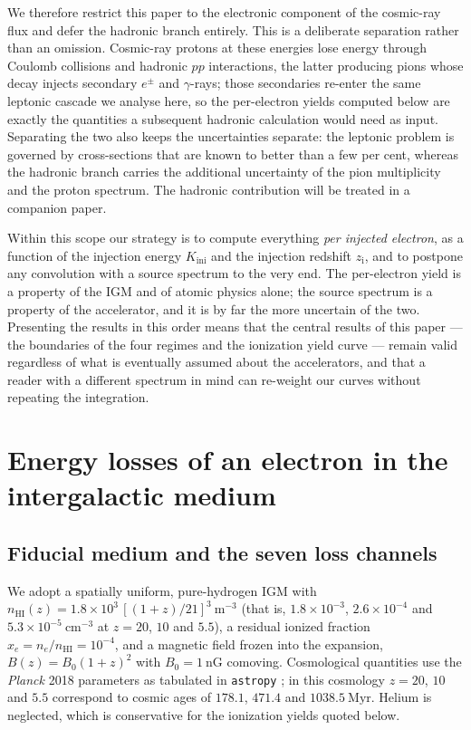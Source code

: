 \documentclass[twocolumn]{article}
\newcommand{\Kini}{K_{\mathrm{ini}}}
\newcommand{\zi}{z_{\mathrm{i}}}
\begin{document}
We therefore restrict this paper to the electronic component of the cosmic-ray
flux and defer the hadronic branch entirely. This is a deliberate separation
rather than an omission. Cosmic-ray protons at these energies lose energy
through Coulomb collisions and hadronic $pp$ interactions, the latter producing
pions whose decay injects secondary $e^{\pm}$ and $\gamma$-rays; those
secondaries re-enter the same leptonic cascade we analyse here, so the
per-electron yields computed below are exactly the quantities a subsequent
hadronic calculation would need as input. Separating the two also keeps the
uncertainties separate: the leptonic problem is governed by cross-sections that
are known to better than a few per cent, whereas the hadronic branch carries
the additional uncertainty of the pion multiplicity and the proton spectrum.
The hadronic contribution will be treated in a companion paper.

Within this scope our strategy is to compute everything \emph{per injected
electron}, as a function of the injection energy $\Kini$ and the injection
redshift $\zi$, and to postpone any convolution with a source spectrum to the
very end. The per-electron yield is a property of the IGM and of atomic
physics alone; the source spectrum is a property of the accelerator, and it is
by far the more uncertain of the two. Presenting the results in this order
means that the central results of this paper --- the boundaries of the four
regimes and the ionization yield curve --- remain valid regardless of what is
eventually assumed about the accelerators, and that a reader with a different
spectrum in mind can re-weight our curves without repeating the integration.

\section{Energy losses of an electron in the intergalactic medium}
\label{sec:method}

\subsection{Fiducial medium and the seven loss channels}

We adopt a spatially uniform, pure-hydrogen IGM with
$n_{\mathrm{HI}}(z) = 1.8\times10^{3}\,[(1+z)/21]^{3}\ \mathrm{m^{-3}}$
(that is, $1.8\times10^{-3}$, $2.6\times10^{-4}$ and
$5.3\times10^{-5}\ \mathrm{cm^{-3}}$ at $z = 20$, $10$ and $5.5$), a residual
ionized fraction $x_e = n_e/n_{\mathrm{HI}} = 10^{-4}$, and a magnetic field
frozen into the expansion, $B(z) = B_0 (1+z)^{2}$ with $B_0 = 1\ \mathrm{nG}$
comoving. Cosmological quantities use the \emph{Planck} 2018 parameters
\citep{Planck2020} as tabulated in \texttt{astropy} \citep{Astropy2022}; in
this cosmology $z = 20$, $10$ and $5.5$ correspond to cosmic ages of $178.1$,
$471.4$ and $1038.5\ \mathrm{Myr}$. Helium is neglected, which is conservative
for the ionization yields quoted below.
\end{document}
